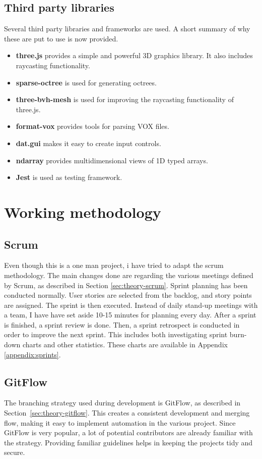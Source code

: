 \subsection{Third party libraries}
Several third party libraries and frameworks are used. A short summary of why these are put to use is now provided.
\begin{itemize}
    \item \textbf{three.js} provides a simple and powerful 3D graphics library. It also includes raycasting functionality.
    \item \textbf{sparse-octree} is used for generating octrees.
    \item \textbf{three-bvh-mesh} is used for improving the raycasting functionality of three.js.
    \item \textbf{format-vox} provides tools for parsing VOX files.
    \item \textbf{dat.gui} makes it easy to create input controls.
    \item \textbf{ndarray} provides multidimensional views of 1D typed arrays.
    \item \textbf{Jest} is used as testing framework.
\end{itemize}

\section{Working methodology}
\subsection{Scrum}
Even though this is a one man project, i have tried to adapt the scrum methodology. The main changes done are regarding the various meetings defined by Scrum, as described in Section \ref{sec:theory-scrum}. Sprint planning has been conducted normally. User stories
are selected from the backlog, and story points are assigned. The sprint is then executed. Instead of daily stand-up meetings with a team, I have have set aside 10-15 minutes for planning every day. After a sprint is finished, a sprint review is done. Then, a sprint retrospect is conducted in order to improve the next sprint. This includes both investigating sprint burn-down charts and other statistics. These charts are available in Appendix \ref{appendix:sprints}.

\subsection{GitFlow}
The branching strategy used during development is GitFlow, as described in Section~\ref{sec:theory-gitflow}. This creates a consistent development and merging flow, making it easy to implement automation in the various project. Since GitFlow is very popular, a lot of potential contributors are already familiar with the strategy. Providing familiar guidelines helps in keeping the projects tidy and secure.

